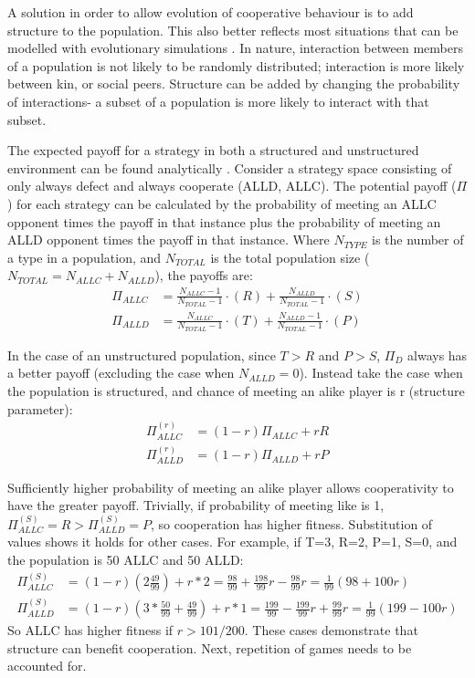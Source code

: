 \documentclass[a4paper,11pt]{article}
\begin{document}
A solution in order to allow evolution of cooperative behaviour is to add structure to the population. 
This also better reflects most situations that can be modelled with evolutionary simulations \citep{eshel:PNAS:1982}. 
In nature, interaction between members of a population is not likely to be randomly distributed; interaction is more likely between kin, or social peers. 
Structure can be added by changing the probability of interactions- a subset of a population is more likely to interact with that subset. 

The expected payoff for a strategy in both a structured and unstructured environment can be found analytically \citep{van-veelen:PNAS:2012}. 
Consider a strategy space consisting of only always defect and always cooperate (ALLD, ALLC). 
The potential payoff ($\Pi$) for each strategy can be calculated by the probability of meeting an ALLC opponent times the payoff in that instance plus the probability of meeting an ALLD opponent times the payoff in that instance. Where $N_{TYPE}$ is the number of a type in a population, and $N_{TOTAL}$ is the total population size ($N_{TOTAL}=N_{ALLC}+ N_{ALLD}$), the payoffs are:
\begin{align*}
\Pi_{ALLC}&=\frac{N_{ALLC}-1}{N_{TOTAL}-1} \cdot (R) + \frac{N_{ALLD}}{N_{TOTAL}-1}\cdot ({S})\\
\Pi_{ALLD}&=\frac{N_{ALLC}}{N_{TOTAL}-1} \cdot (T) + \frac{N_{ALLD}-1}{N_{TOTAL}-1}\cdot ({P})
\end{align*}

In the case of an unstructured population, since $T>R$ and $P>S$, $\Pi_D$ always has a better payoff (excluding the case when $N_{ALLD}=0$). 
Instead take the case when the population is structured, and chance of meeting an alike player is r (structure parameter):
\begin{align*}
\Pi^{(r)}_{ALLC}&=(1-r)\Pi_{ALLC}+ rR\\
\Pi^{(r)}_{ALLD}&=(1-r)\Pi_{ALLD}+ rP
\end{align*}

Sufficiently higher probability of meeting an alike player allows cooperativity to have the greater payoff. 
Trivially, if probability of meeting like is 1, $\Pi^{(S)}_{ALLC}=R>\Pi^{(S)}_{ALLD}=P$, so cooperation has higher fitness.  
Substitution of values shows it holds for other cases. 
For example, if T=3, R=2, P=1, S=0, and the population is 50 ALLC and 50 ALLD:
\begin{align*}
\Pi^{(S)}_{ALLC}&=(1-r)(2\frac{49}{99})+r*2=\frac{98}{99}+\frac{198}{99}r-\frac{98}{99}r=\frac{1}{99}(98+100r)\\
\Pi^{(S)}_{ALLD}&=(1-r)(3*\frac{50}{99} + \frac{49}{99})+ r*1=\frac{199}{99}-\frac{199}{99}r+\frac{99}{99}r=\frac{1}{99}(199-100r)
\end{align*}
So ALLC has higher fitness if $r>101/200$. These cases demonstrate that structure can benefit cooperation. 
Next, repetition of games needs to be accounted for. 
\end{document}
